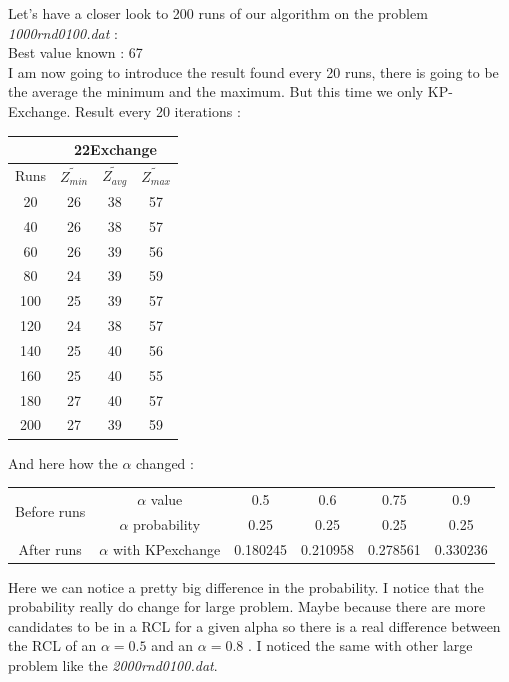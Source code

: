 \documentclass[12pt]{article}
\begin{document}
	
	Let's have a closer look to 200 runs of our algorithm on the problem \textit{1000rnd0100.dat} :\\
	Best value known : 67\\
	I am now going to introduce the result found every 20 runs, there is going to be the average the minimum and the maximum. But this time we only KP-Exchange.
	Result every 20 iterations : 
	\begin{center}
		\begin{tabular}{|c|c|c|c|}
			\hline
			&\multicolumn{3}{|c|}{22Exchange}\\
			\hline
			Runs& $\tilde{Z_{min }}$ & $\tilde{Z_{avg}}$ & $\tilde{Z_{max}}$ \\ 
			\hline
			20 & 26 & 38 & 57 \\
			\hline
			40& 26 & 38 & 57 \\
			\hline
			60& 26 & 39 & 56 \\
			\hline
			80& 24 & 39 & 59 \\
			\hline
			100& 25 & 39 & 57\\
			\hline
			120& 24 & 38 & 57 \\
			\hline
			140& 25 & 40 & 56 \\
			\hline
			160& 25 & 40 & 55 \\
			\hline
			180& 27 & 40 & 57 \\
			\hline
			200& 27 & 39 & 59 \\
			\hline
		\end{tabular}
	\end{center}
	And here how the $ \alpha $ changed :
	\begin{center}
		\begin{tabular}{|c|c|c|c|c|c|}
			\hline
			\multirow{2}{*}{Before runs} & $\alpha$ value &0.5 & 0.6 & 0.75 & 0.9 \\
			
			&$\alpha$ probability & 0.25 & 0.25 & 0.25 & 0.25  \\
			\hline
			After runs& $\alpha$ with KPexchange & 0.180245& 0.210958& 0.278561& 0.330236 \\
			
			\hline
		\end{tabular}
	\end{center}
	Here we can notice a pretty big difference in the probability. I notice that the probability really do change for large problem. Maybe because there are more candidates to be in a RCL for a given alpha so there is a real difference between the RCL of an $ \alpha = 0.5$ and an $ \alpha = 0.8$  .
	I noticed the same with other large problem like the \textit{2000rnd0100.dat}.
	\\
	\pagebreak	
\end{document}
